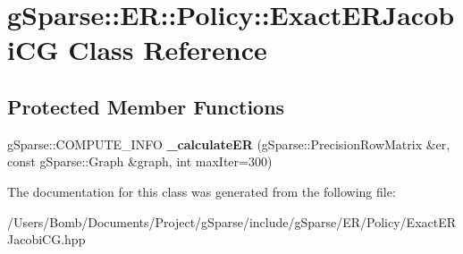 \hypertarget{classg_sparse_1_1_e_r_1_1_policy_1_1_exact_e_r_jacobi_c_g}{}\section{g\+Sparse\+:\+:ER\+:\+:Policy\+:\+:Exact\+E\+R\+Jacobi\+CG Class Reference}
\label{classg_sparse_1_1_e_r_1_1_policy_1_1_exact_e_r_jacobi_c_g}
\subsection*{Protected Member Functions}
\begin{DoxyCompactItemize}
\item 
\mbox{\label{classg_sparse_1_1_e_r_1_1_policy_1_1_exact_e_r_jacobi_c_g_a2a57ba70f88213015cdccf1697b375b0}} 
g\+Sparse\+::\+C\+O\+M\+P\+U\+T\+E\+\_\+\+I\+N\+FO {\bfseries \+\_\+calculate\+ER} (g\+Sparse\+::\+Precision\+Row\+Matrix \&er, const g\+Sparse\+::\+Graph \&graph, int max\+Iter=300)
\end{DoxyCompactItemize}


The documentation for this class was generated from the following file\+:\begin{DoxyCompactItemize}
\item 
/\+Users/\+Bomb/\+Documents/\+Project/g\+Sparse/include/g\+Sparse/\+E\+R/\+Policy/Exact\+E\+R\+Jacobi\+C\+G.\+hpp\end{DoxyCompactItemize}
